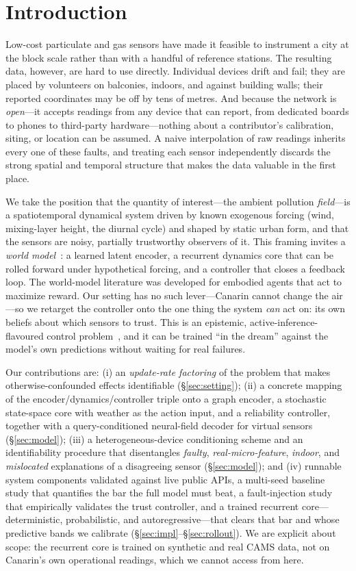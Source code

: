 \documentclass[10pt]{article}
\begin{document}
\section{Introduction}
Low-cost particulate and gas sensors have made it feasible to instrument a city
at the block scale rather than with a handful of reference stations. The
resulting data, however, are hard to use directly. Individual devices drift and
fail; they are placed by volunteers on balconies, indoors, and against building
walls; their reported coordinates may be off by tens of metres. And because the network
is \emph{open}---it accepts readings from any device that can report, from
dedicated boards to phones to third-party hardware---nothing about a contributor's
calibration, siting, or location can be assumed. A naive
interpolation of raw readings inherits every one of these faults, and treating
each sensor independently discards the strong spatial and temporal structure that
makes the data valuable in the first place.

We take the position that the quantity of interest---the ambient pollution
\emph{field}---is a spatiotemporal dynamical system driven by known exogenous
forcing (wind, mixing-layer height, the diurnal cycle) and shaped by static urban
form, and that the sensors are noisy, partially trustworthy observers of it. This
framing invites a \emph{world model}~\citep{ha2018world}: a learned latent
encoder, a recurrent dynamics core that can be rolled forward under hypothetical
forcing, and a controller that closes a feedback loop. The world-model literature
was developed for embodied agents that act to maximize reward. Our setting has no
such lever---Canarin cannot change the air---so we retarget the controller onto
the one thing the system \emph{can} act on: its own beliefs about which sensors to
trust. This is an epistemic, active-inference-flavoured control
problem~\citep{friston2010free}, and it can be trained ``in the dream'' against
the model's own predictions without waiting for real failures.

Our contributions are: (i) an \emph{update-rate factoring} of the problem that
makes otherwise-confounded effects identifiable (\S\ref{sec:setting}); (ii) a
concrete mapping of the encoder/dynamics/controller triple onto a graph encoder,
a stochastic state-space core with weather as the action input, and a
reliability controller, together with a query-conditioned neural-field decoder
for virtual sensors (\S\ref{sec:model}); (iii) a heterogeneous-device conditioning
scheme and an identifiability procedure that disentangles \emph{faulty},
\emph{real-micro-feature}, \emph{indoor}, and \emph{mislocated} explanations of a
disagreeing sensor (\S\ref{sec:model}); and (iv) runnable system components
validated against live public APIs, a multi-seed baseline study that quantifies
the bar the full model must beat, a fault-injection study that empirically
validates the trust controller, and a trained recurrent core---deterministic,
probabilistic, and autoregressive---that clears that bar and whose predictive
bands we calibrate (\S\ref{sec:impl}--\S\ref{sec:rollout}). We are
explicit about scope: the recurrent core is trained on synthetic and real CAMS
data, not on Canarin's own operational readings, which we cannot access from here.
\end{document}
